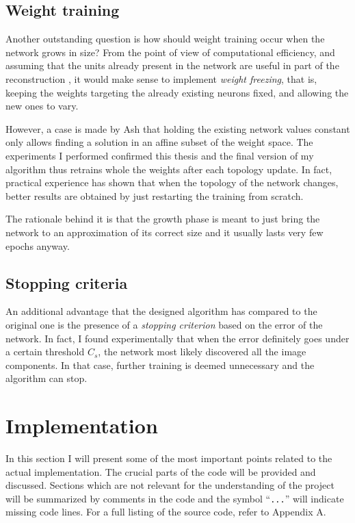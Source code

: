\documentclass[11pt,a4paper]{report}
\newcommand{\quot}[1]{``#1''}
\begin{document}
			\subsection{Weight training}
				\label{sec:weight}
				Another outstanding question is how should weight training occur when the network grows in size? From the point of view of computational efficiency, and assuming that the units already present in the network are useful in part of the reconstruction \cite{kwok1997objective}, it would make sense to implement \emph{weight freezing}, that is, keeping the weights targeting the already existing neurons fixed, and allowing the new ones to vary.
				
				However, a case is made by Ash \cite{ash1989dynamic} that holding the existing network values constant only allows finding a solution in an affine subset of the weight space. The experiments I performed confirmed this thesis and the final version of my algorithm thus retrains whole the weights after each topology update. In fact, practical experience has shown that when the topology of the network changes, better results are obtained by just restarting the training from scratch.
				
				The rationale behind it is that the growth phase is meant to just bring the network to an approximation of its correct size and it usually lasts very few epochs anyway.
			
			\subsection{Stopping criteria}
				\label{sec:stopping}
				An additional advantage that the designed algorithm has compared to the original one is the presence of a \emph{stopping criterion} based on the error of the network. In fact, I found experimentally that when the error definitely goes under a certain threshold $C_s$, the network most likely discovered all the image components. In that case, further training is deemed unnecessary and the algorithm can stop.
			
		\section{Implementation}
			In this section I will present some of the most important points related to the actual implementation. The crucial parts of the code will be provided and discussed. Sections which are not relevant for the understanding of the project will be summarized by comments in the code and the symbol \quot{\texttt{...}} will indicate missing code lines. For a full listing of the source code, refer to Appendix A.
			
\end{document}
